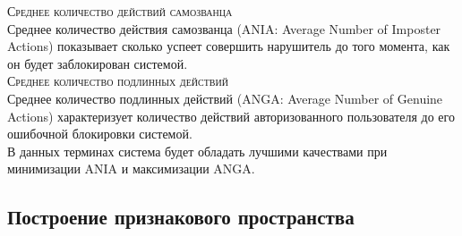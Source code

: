 \documentclass[12pt]{article}
\begin{document}
    \noident\textsc{Среднее количество действий самозванца} \\
    Среднее количество действия самозванца (ANIA: Average Number of Imposter Actions) показывает сколько успеет совершить нарушитель до того момента, как он будет заблокирован системой. \\

    \noident\textsc{Среднее количество подлинных действий} \\
    Среднее количество подлинных действий (ANGA: Average Number of Genuine Actions) характеризует количество действий авторизованного пользователя до его ошибочной блокировки системой. \\

    В данных терминах система будет обладать лучшими качествами при минимизации ANIA и максимизации ANGA.


    \subsection{Построение признакового пространства}
    \label{sec:Overview:Features}
    
\end{document}
